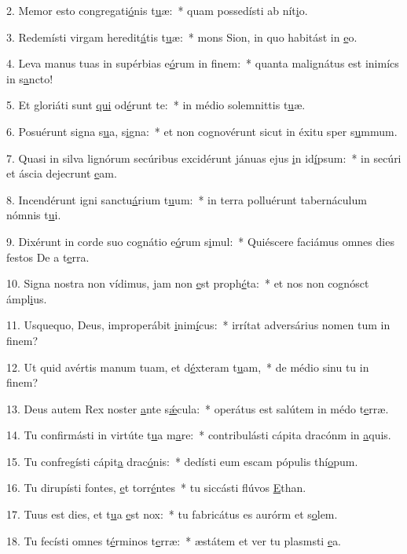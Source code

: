 2. Memor esto congregati\uline{ó}nis t\uline{u}æ:~* quam possedísti ab nít\uline{i}o.\par 
3. Redemísti virgam heredit\uline{á}tis t\uline{u}æ:~* mons Sion, in quo habitást in \uline{e}o.\par 
4. Leva manus tuas in supérbias e\uline{ó}rum in f\uline{i}nem:~* quanta malignátus est inimícs in s\uline{a}ncto!\par 
5. Et gloriáti sunt \uline{qui} od\uline{é}runt te:~* in médio solemnittis t\uline{u}æ.\par 
6. Posuérunt signa s\uline{u}a, s\uline{i}gna:~* et non cognovérunt sicut in éxitu sper s\uline{u}mmum.\par 
7. Quasi in silva lignórum secúribus excidérunt jánuas ejus \uline{i}n id\uline{í}psum:~* in secúri et áscia dejecrunt \uline{e}am.\par 
8. Incendérunt igni sanctu\uline{á}rium t\uline{u}um:~* in terra polluérunt tabernáculum nómnis t\uline{u}i.\par 
9. Dixérunt in corde suo cognátio e\uline{ó}rum s\uline{i}mul:~* Quiéscere faciámus omnes dies festos De a t\uline{e}rra.\par 
10. Signa nostra non vídimus, jam non \uline{e}st proph\uline{é}ta:~* et nos non cognósct ámpl\uline{i}us.\par 
11. Usquequo, Deus, improperábit \uline{i}nim\uline{í}cus:~* irrítat adversárius nomen tum in f\uline{i}nem?\par 
12. Ut quid avértis manum tuam, et d\uline{é}xteram t\uline{u}am,~* de médio sinu tu in f\uline{i}nem?\par 
13. Deus autem Rex noster \uline{a}nte s\uline{ǽ}cula:~* operátus est salútem in médo t\uline{e}rræ.\par 
14. Tu confirmásti in virtúte t\uline{u}a m\uline{a}re:~* contribulásti cápita dracónm in \uline{a}quis.\par 
15. Tu confregísti cápit\uline{a} drac\uline{ó}nis:~* dedísti eum escam pópulis thí\uline{o}pum.\par 
16. Tu dirupísti fontes, \uline{e}t torr\uline{é}ntes~* tu siccásti flúvos \uline{E}than.\par 
17. Tuus est dies, et t\uline{u}a \uline{e}st nox:~* tu fabricátus es aurórm et s\uline{o}lem.\par 
18. Tu fecísti omnes t\uline{é}rminos t\uline{e}rræ:~* æstátem et ver tu plasmsti \uline{e}a.\par 
